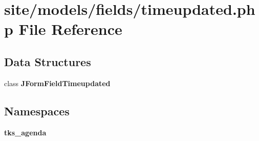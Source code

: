 \section{site/models/fields/timeupdated.php File Reference}
\label{site_2models_2fields_2timeupdated_8php}
\subsection*{Data Structures}
\begin{DoxyCompactItemize}
\item 
class \textbf{ J\+Form\+Field\+Timeupdated}
\end{DoxyCompactItemize}
\subsection*{Namespaces}
\begin{DoxyCompactItemize}
\item 
 \textbf{ tks\+\_\+agenda}
\end{DoxyCompactItemize}
